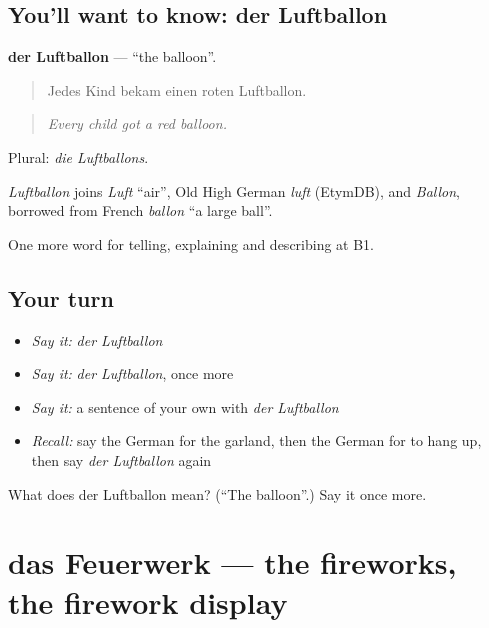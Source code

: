 \subsection*{You'll want to know: der Luftballon}
\textbf{der Luftballon} — \textquotedblleft{}the balloon\textquotedblright{}.

\begin{quote}
Jedes Kind bekam einen roten Luftballon.
\end{quote}

\begin{quote}
\emph{Every child got a red balloon.}
\end{quote}

Plural: \emph{die Luftballons}.

\begin{cousinweb}
\emph{Luftballon} joins \emph{Luft} \textquotedblleft{}air\textquotedblright{}, Old High German \emph{luft} (EtymDB), and \emph{Ballon}, borrowed from French \emph{ballon} \textquotedblleft{}a large ball\textquotedblright{}.
\end{cousinweb}

\begin{grammarlens}[title={What you've built}]
One more word for telling, explaining and describing at B1.
\end{grammarlens}

\subsection*{Your turn}
\begin{itemize}
\raggedright
  \item \emph{Say it:} \emph{der Luftballon}
  \item \emph{Say it:} \emph{der Luftballon}, once more
  \item \emph{Say it:} a sentence of your own with \emph{der Luftballon}
  \item \emph{Recall:} say the German for the garland, then the German for to hang up, then say \emph{der Luftballon} again
\end{itemize}

\begin{tcolorbox}[breakable,colback=teal!4,colframe=teal!35!black,title={Before you move on}]
What does der Luftballon mean? (\textquotedblleft{}The balloon\textquotedblright{}.) Say it once more.
\end{tcolorbox}
\section[das Feuerwerk]{das Feuerwerk — the fireworks, the firework display}

